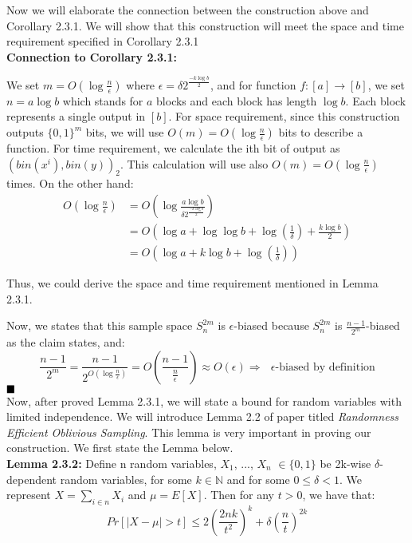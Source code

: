 \documentclass[a4paper, english]{paper}
\begin{document}
 Now we will elaborate the connection between the construction above and Corollary 2.3.1. We will show that this construction will meet the space and time requirement specified in Corollary 2.3.1\\

\noindent\textbf{Connection to Corollary 2.3.1:}\par
\noindent We set $m=O(\log \frac n \epsilon)$ where $\epsilon = \delta 2^{\frac{-k\log b}2}$, and for function $f: [a]\rightarrow[b]$, we set $n=a\log b$ which stands for $a$ blocks and each block has length $\log b$. Each block represents a single output in $[b]$. For space requirement, since this construction outputs $\{0,1\}^m$ bits, we will use $O(m)=O(\log \frac n \epsilon)$ bits to describe a function. For time requirement, we calculate the ith bit of output as $(bin(x^i),bin(y))_2$. This calculation will use also $O(m)=O(\log \frac n \epsilon)$ times. On the other hand:
\begin{align*}
O(\log \frac n \epsilon) &= O(\log \frac{a\log b}{\delta 2^{\frac{-k\log b}2}})\\
&= O(\log a + \log\log b+\log(\frac1\delta)+\frac{k \log b}2)\\
&= O(\log a + k \log b+ \log(\frac1\delta))
\end{align*}\par
Thus, we could derive the space and time requirement mentioned in Lemma 2.3.1.\par
Now, we states that this sample space $S^{2m}_n$ is $\epsilon$-biased because $S^{2m}_n$ is $\frac{n-1}{2^m}$-biased as the claim states, and:
$$\frac{n-1}{2^m} = \frac{n-1}{2^{O(\log\frac n \epsilon)}} = O(\frac{n-1}{\frac n \epsilon}) \approx O(\epsilon)\Rightarrow \text{ $\epsilon$-biased by definition}$$
$\hfill\blacksquare$ \\

\vspace{0.5cm}
 Now, after proved Lemma 2.3.1, we will state a bound for random variables with limited independence. We will introduce Lemma 2.2 of paper titled \textit{Randomness Efficient Oblivious Sampling}. This lemma is very important in proving our construction. We first state the Lemma below.\\

\noindent\textbf{Lemma 2.3.2:} Define n random variables, $X_1$, ..., $X_n$ $\in \{0, 1\}$ be 2k-wise $\delta$-dependent random variables, for some $k \in \mathbb{N}$ and for some $0 \le \delta < 1$. We represent $X = \sum_{i \in n} X_i$  and $\mu = E[X]$. Then for any $t > 0$, we have that:
	$$ Pr[|X - \mu| > t] \le 2(\frac{2nk}{t^2})^k + \delta(\frac{n}{t})^{2k} $$
	
\end{document}
